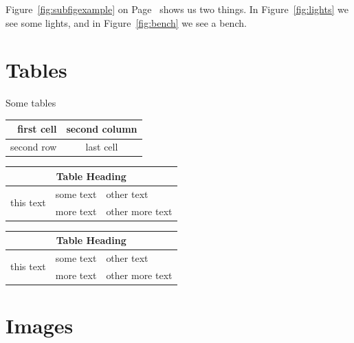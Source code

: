 \documentclass[12pt,twoside,a4paper]{article}
\begin{document}
Figure~\ref{fig:subfigexample} on Page~\pageref{fig:subfigexample} shows us two things. In Figure~\ref{fig:lights} we see some lights, and in Figure~\ref{fig:bench} we see a bench.

\lipsum[5-6]

\section{Tables}

Some tables

\vspace{0.2in}

\begin{tabular}{| r | c |}
\hline
first cell & second column \\
\hline
second row & last cell \\
\hline
\end{tabular}

\vspace{0.2in}




\vspace{0.2in}

\begin{tabular}{ | r | c | l | }
    \hline
    \multicolumn{3}{|c|}{Table Heading} \\
\hline
    \multirow{2}{*}{this text} & some text & other text \\
     & more text & other more text \\
    \hline
\end{tabular}

\vspace{0.2in}

\begin{tabularx}{\textwidth}{ | X | X | X | }
    \hline
    \multicolumn{3}{|c|}{Table Heading} \\
\hline
    \multirow{2}{*}{this text} & some text & other text \\
     & more text & other more text \\
    \hline
\end{tabularx}

\section{Images}

\setlength\fboxrule{6pt}
\setlength\fboxsep{0pt}
\end{document}
